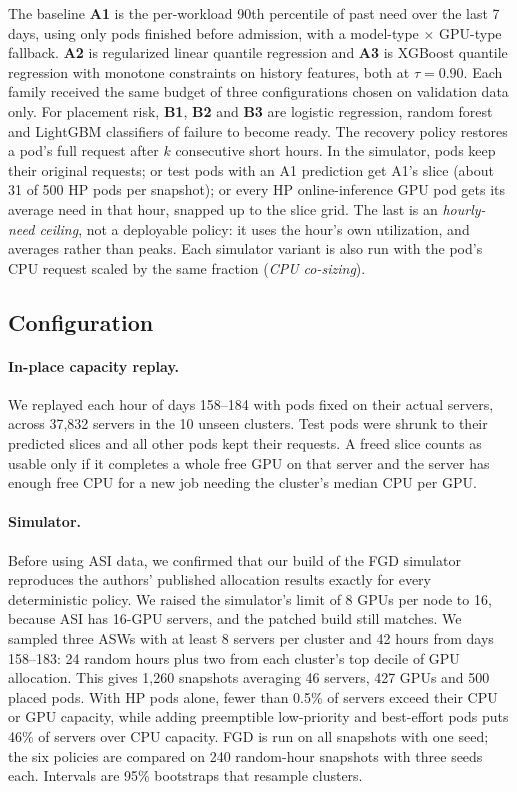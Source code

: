 \documentclass[10pt]{article}
\begin{document}
The baseline \textbf{A1} is the per-workload 90th percentile of past need over the last 7 days, using only pods finished before admission, with a model-type $\times$ GPU-type fallback. \textbf{A2} is regularized linear quantile regression and \textbf{A3} is XGBoost quantile regression with monotone constraints on history features, both at $\tau = 0.90$. Each family received the same budget of three configurations chosen on validation data only. For placement risk, \textbf{B1}, \textbf{B2} and \textbf{B3} are logistic regression, random forest and LightGBM classifiers of failure to become ready. The recovery policy restores a pod's full request after $k$ consecutive short hours. In the simulator, pods keep their original requests; or test pods with an A1 prediction get A1's slice (about 31 of 500 HP pods per snapshot); or every HP online-inference GPU pod gets its average need in that hour, snapped up to the slice grid. The last is an \emph{hourly-need ceiling}, not a deployable policy: it uses the hour's own utilization, and averages rather than peaks. Each simulator variant is also run with the pod's CPU request scaled by the same fraction (\emph{CPU co-sizing}).

\subsection{Configuration}
\label{sec:config}

\paragraph{In-place capacity replay.} We replayed each hour of days 158--184 with pods fixed on their actual servers, across 37{,}832 servers in the 10 unseen clusters. Test pods were shrunk to their predicted slices and all other pods kept their requests. A freed slice counts as usable only if it completes a whole free GPU on that server and the server has enough free CPU for a new job needing the cluster's median CPU per GPU.

\paragraph{Simulator.} Before using ASI data, we confirmed that our build of the FGD simulator reproduces the authors' published allocation results exactly for every deterministic policy. We raised the simulator's limit of 8 GPUs per node to 16, because ASI has 16-GPU servers, and the patched build still matches. We sampled three ASWs with at least 8 servers per cluster and 42 hours from days 158--183: 24 random hours plus two from each cluster's top decile of GPU allocation. This gives 1{,}260 snapshots averaging 46 servers, 427 GPUs and 500 placed pods. With HP pods alone, fewer than 0.5\% of servers exceed their CPU or GPU capacity, while adding preemptible low-priority and best-effort pods puts 46\% of servers over CPU capacity. FGD is run on all snapshots with one seed; the six policies are compared on 240 random-hour snapshots with three seeds each. Intervals are 95\% bootstraps that resample clusters.
\end{document}
